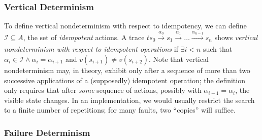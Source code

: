 \subsubsection{Vertical Determinism}

To define vertical nondeterminism with
respect to idempotency, we can
define $\mathcal{I} \subseteq A$, the set of \emph{idempotent}
actions.  A trace $t s_0
\xrightarrow[]{\alpha_0} s_1 \xrightarrow[]{\alpha_1} \ldots
\xrightarrow[]{\alpha_{n-1}} s_n$ shows \emph{vertical nondeterminism
  with respect to idempotent operations} if $\exists i < n$ such that
$\alpha_i \in \mathcal{I} \wedge \alpha_i = \alpha_{i+1}$ and $v(s_{i+1})
\neq v(s_{i+2})$.  Note that vertical nondeterminism may, in theory, exhibit only
after a sequence of more than two successive applications of a (supposedly)
idempotent operation; the definition only requires that after \emph{some}
sequence of actions, possibly with $\alpha_{i-1} = \alpha_i$, the
visible state changes.  In an implementation, we would usually restrict the
search to a finite number of repetitions; for many faults, two
``copies'' will suffice.

\subsubsection{Failure Determinism}

